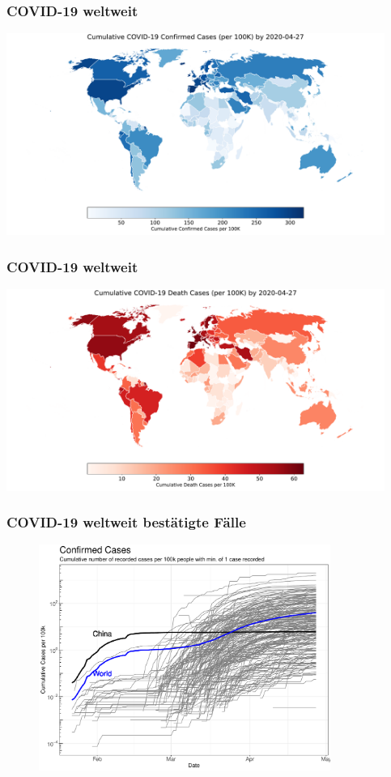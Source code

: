 \documentclass{beamer}
\begin{document}
 \begin{frame}
 	\frametitle{COVID-19 weltweit}
		\centering
		\includegraphics[width = 350pt]{world_confirmed_27042020.pdf}
 \end{frame}

 \begin{frame}
 	\frametitle{COVID-19 weltweit}
		\centering
		\includegraphics[width = 350pt]{world_death_27042020.pdf}
 \end{frame}
 
 \begin{frame}
 	\frametitle{COVID-19 weltweit bestätigte Fälle}
	\begin{figure}
		\centering
		\includegraphics[width = 270pt]{Cases_cumulative_confirmed.pdf}
	\end{figure}
 \end{frame}
\end{document}
